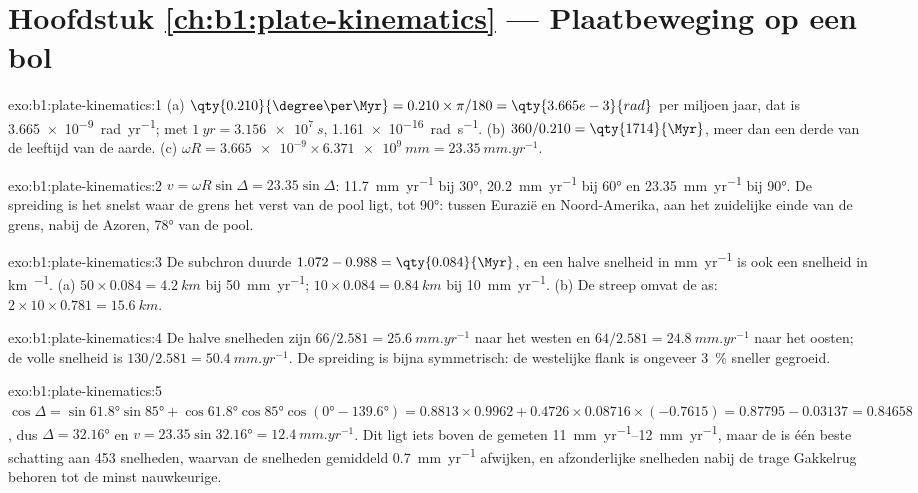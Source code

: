 \section*{Hoofdstuk \ref{ch:b1:plate-kinematics} --- Plaatbeweging op een bol}

\begin{solution}{exo:b1:plate-kinematics:1}
(a) $\qty{0.210}{\degree\per\Myr} = 0.210\times\pi/180 = \qty{3.665e-3}{rad}$
per miljoen jaar, dat is \qty{3.665e-9}{rad.yr^{-1}}; met
$\qty{1}{yr} = \qty{3.156e7}{s}$, \qty{1.161e-16}{rad.s^{-1}}. (b) $360/0.210 =
\qty{1714}{\Myr}$, meer dan een derde van de leeftijd van de aarde. (c) $\omega R =
\num{3.665e-9}\times\qty{6.371e9}{mm} = \qty{23.35}{mm.yr^{-1}}$.
\end{solution}

\begin{solution}{exo:b1:plate-kinematics:2}
$v = \omega R\sin\Delta = 23.35\sin\Delta$: \qty{11.7}{mm.yr^{-1}} bij \ang{30},
\qty{20.2}{mm.yr^{-1}} bij \ang{60} en \qty{23.35}{mm.yr^{-1}} bij \ang{90}. De
spreiding is het snelst waar de grens het verst van de pool ligt, tot
\ang{90}: tussen Eurazië en Noord-Amerika, aan het zuidelijke einde van de grens, nabij de Azoren, \ang{78} van de pool.
\end{solution}

\begin{solution}{exo:b1:plate-kinematics:3}
De subchron duurde $1.072 - 0.988 = \qty{0.084}{\Myr}$, en een halve snelheid in
\unit{mm.yr^{-1}} is ook een snelheid in \unit{km\per\Myr}. (a) $50\times0.084 =
\qty{4.2}{km}$ bij \qty{50}{mm.yr^{-1}}; $10\times0.084 = \qty{0.84}{km}$ bij
\qty{10}{mm.yr^{-1}}. (b) De streep omvat de as:
$2\times10\times0.781 = \qty{15.6}{km}$.
\end{solution}

\begin{solution}{exo:b1:plate-kinematics:4}
De halve snelheden zijn $66/2.581 = \qty{25.6}{mm.yr^{-1}}$ naar het westen en
$64/2.581 = \qty{24.8}{mm.yr^{-1}}$ naar het oosten; de volle snelheid is
$130/2.581 = \qty{50.4}{mm.yr^{-1}}$. De
spreiding is bijna symmetrisch: de westelijke flank is ongeveer \qty{3}{\percent} sneller gegroeid.
\end{solution}

\begin{solution}{exo:b1:plate-kinematics:5}
$\cos\Delta = \sin\ang{61.8}\sin\ang{85} + \cos\ang{61.8}\cos\ang{85}
\cos(\ang{0} - \ang{139.6}) = 0.8813\times0.9962 + 0.4726\times0.08716\times
(-0.7615) = 0.87795 - 0.03137 = 0.84658$, dus $\Delta = \ang{32.16}$ en
$v = 23.35\sin\ang{32.16} = \qty{12.4}{mm.yr^{-1}}$. Dit ligt iets boven de gemeten \qtyrange{11}{12}{mm.yr^{-1}}, maar de  is één beste schatting aan 453 snelheden, waarvan de snelheden gemiddeld \qty{0.7}{mm.yr^{-1}} afwijken, en afzonderlijke snelheden nabij de trage Gakkelrug behoren tot de minst nauwkeurige.
\end{solution}

